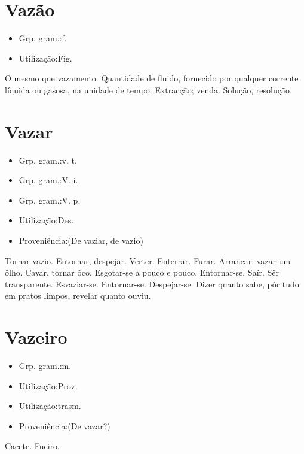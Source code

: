 \documentclass{article}
\begin{document}
\section{Vazão}
\begin{itemize}
\item {Grp. gram.:f.}
\end{itemize}
\begin{itemize}
\item {Utilização:Fig.}
\end{itemize}
O mesmo que \textunderscore vazamento\textunderscore .
Quantidade de fluido, fornecido por qualquer corrente líquida ou gasosa, na unidade de tempo.
Extracção; venda.
Solução, resolução.
\section{Vazar}
\begin{itemize}
\item {Grp. gram.:v. t.}
\end{itemize}
\begin{itemize}
\item {Grp. gram.:V. i.}
\end{itemize}
\begin{itemize}
\item {Grp. gram.:V. p.}
\end{itemize}
\begin{itemize}
\item {Utilização:Des.}
\end{itemize}
\begin{itemize}
\item {Proveniência:(De \textunderscore vaziar\textunderscore , de \textunderscore vazio\textunderscore )}
\end{itemize}
Tornar vazio.
Entornar, despejar.
Verter.
Enterrar.
Furar.
Arrancar: \textunderscore vazar um ôlho\textunderscore .
Cavar, tornar ôco.
Esgotar-se a pouco e pouco.
Entornar-se.
Saír.
Sêr transparente.
Esvaziar-se.
Entornar-se.
Despejar-se.
Dizer quanto sabe, pôr tudo em pratos limpos, revelar quanto ouviu.
\section{Vazeiro}
\begin{itemize}
\item {Grp. gram.:m.}
\end{itemize}
\begin{itemize}
\item {Utilização:Prov.}
\end{itemize}
\begin{itemize}
\item {Utilização:trasm.}
\end{itemize}
\begin{itemize}
\item {Proveniência:(De \textunderscore vazar\textunderscore ?)}
\end{itemize}
Cacete.
Fueiro.
\end{document}
